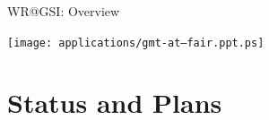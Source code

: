 \documentclass[compress,red]{beamer}
\begin{document}
\begin{frame}{WR@GSI: Overview}


      \begin{center}
	\texttt{[image: applications/gmt-at--fair.ppt.ps]}
      \end{center}  

\end{frame}



\section{Status and Plans}
\end{document}
